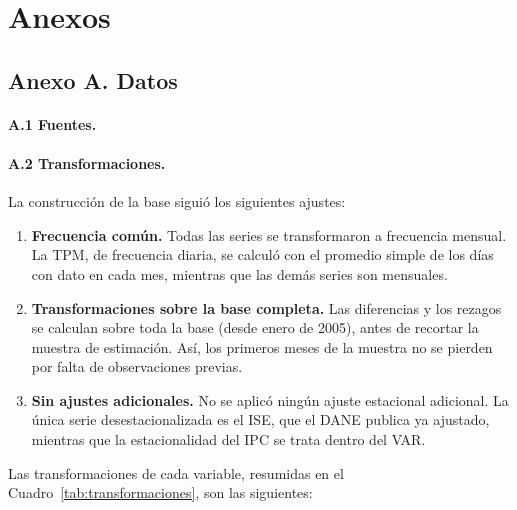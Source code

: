 \documentclass[12pt,letterpaper]{article}
\newcommand{\rutacuadros}{cuadros/}
\newcommand{\cuadro}[1]{}
\begin{document}
\section*{Anexos}

\subsection*{Anexo A. Datos}

\paragraph{A.1 Fuentes.} 

\cuadro{cuadro_fuentes}

\paragraph{A.2 Transformaciones.} La construcción de la base siguió los siguientes ajustes:

\begin{enumerate}[leftmargin=1.5em, itemsep=2pt, topsep=4pt]
\item \textbf{Frecuencia común.} Todas las series se transformaron a frecuencia mensual. La TPM, de frecuencia diaria, se calculó con el promedio simple de los días con dato en cada mes, mientras que las demás series son mensuales.
\item \textbf{Transformaciones sobre la base completa.} Las diferencias y los rezagos se calculan sobre toda la base (desde enero de 2005), antes de recortar la muestra de estimación. Así, los primeros meses de la muestra no se pierden por falta de observaciones previas.
\item \textbf{Sin ajustes adicionales.} No se aplicó ningún ajuste estacional adicional. La única serie desestacionalizada es el ISE, que el DANE publica ya ajustado, mientras que la estacionalidad del IPC se trata dentro del VAR.
\end{enumerate}

Las transformaciones de cada variable, resumidas en el Cuadro~\ref{tab:transformaciones}, son las siguientes:
\end{document}
